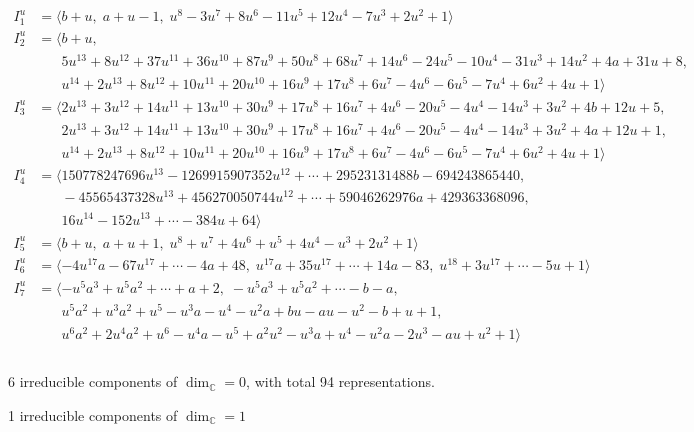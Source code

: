 \documentclass[1p]{elsarticle_modified}
\theoremstyle{definition}
\begin{document}
\begin{align*}
I^u_{1}&=\langle 
b+u,\;a+u-1,\;u^8-3 u^7+8 u^6-11 u^5+12 u^4-7 u^3+2 u^2+1\rangle \\
I^u_{2}&=\langle 
b+u,\\
\phantom{I^u_{2}}&\phantom{= \langle  }5 u^{13}+8 u^{12}+37 u^{11}+36 u^{10}+87 u^9+50 u^8+68 u^7+14 u^6-24 u^5-10 u^4-31 u^3+14 u^2+4 a+31 u+8,\\
\phantom{I^u_{2}}&\phantom{= \langle  }u^{14}+2 u^{13}+8 u^{12}+10 u^{11}+20 u^{10}+16 u^9+17 u^8+6 u^7-4 u^6-6 u^5-7 u^4+6 u^2+4 u+1\rangle \\
I^u_{3}&=\langle 
2 u^{13}+3 u^{12}+14 u^{11}+13 u^{10}+30 u^9+17 u^8+16 u^7+4 u^6-20 u^5-4 u^4-14 u^3+3 u^2+4 b+12 u+5,\\
\phantom{I^u_{3}}&\phantom{= \langle  }2 u^{13}+3 u^{12}+14 u^{11}+13 u^{10}+30 u^9+17 u^8+16 u^7+4 u^6-20 u^5-4 u^4-14 u^3+3 u^2+4 a+12 u+1,\\
\phantom{I^u_{3}}&\phantom{= \langle  }u^{14}+2 u^{13}+8 u^{12}+10 u^{11}+20 u^{10}+16 u^9+17 u^8+6 u^7-4 u^6-6 u^5-7 u^4+6 u^2+4 u+1\rangle \\
I^u_{4}&=\langle 
150778247696 u^{13}-1269915907352 u^{12}+\cdots+29523131488 b-694243865440,\\
\phantom{I^u_{4}}&\phantom{= \langle  }-45565437328 u^{13}+456270050744 u^{12}+\cdots+59046262976 a+429363368096,\\
\phantom{I^u_{4}}&\phantom{= \langle  }16 u^{14}-152 u^{13}+\cdots-384 u+64\rangle \\
I^u_{5}&=\langle 
b+u,\;a+u+1,\;u^8+u^7+4 u^6+u^5+4 u^4- u^3+2 u^2+1\rangle \\
I^u_{6}&=\langle 
-4 u^{17} a-67 u^{17}+\cdots-4 a+48,\;u^{17} a+35 u^{17}+\cdots+14 a-83,\;u^{18}+3 u^{17}+\cdots-5 u+1\rangle \\
I^u_{7}&=\langle 
- u^5 a^3+u^5 a^2+\cdots+a+2,\;- u^5 a^3+u^5 a^2+\cdots- b- a,\\
\phantom{I^u_{7}}&\phantom{= \langle  }u^5 a^2+u^3 a^2+u^5- u^3 a- u^4- u^2 a+b u- a u- u^2- b+u+1,\\
\phantom{I^u_{7}}&\phantom{= \langle  }u^6 a^2+2 u^4 a^2+u^6- u^4 a- u^5+a^2 u^2- u^3 a+u^4- u^2 a-2 u^3- a u+u^2+1\rangle \\
\\
\end{align*}
\raggedright * 6 irreducible components of $\dim_{\mathbb{C}}=0$, with total 94 representations.\\
\raggedright * 1 irreducible components of $\dim_{\mathbb{C}}=1$ \\
\end{document}
